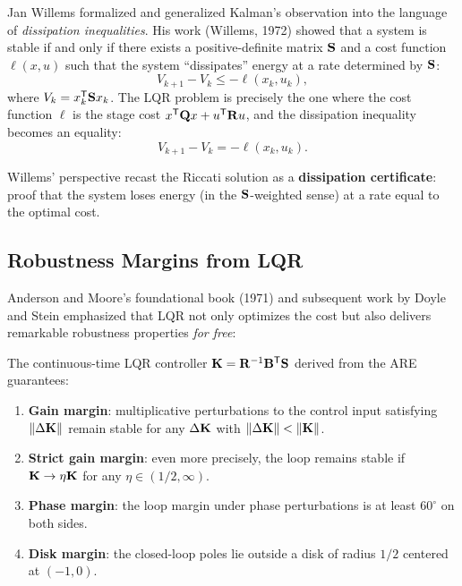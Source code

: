 Jan Willems formalized and generalized Kalman's observation into the language of \textit{dissipation inequalities}.
His work (Willems, 1972) showed that a system is stable if and only if there exists a positive-definite matrix $\mathbf{S}$
and a cost function $\ell(x, u)$ such that the system ``dissipates'' energy at a rate determined by $\mathbf{S}$:
\begin{equation}
V_{k+1} - V_k \leq -\ell(x_k, u_k),
\label{eq:ch6:dissipation}
\end{equation}
where $V_k = x_k^{\mathsf{T}} \mathbf{S} x_k$. The LQR problem is precisely the one where the cost function $\ell$ is the stage cost
$x^{\mathsf{T}}\mathbf{Q} x + u^{\mathsf{T}}\mathbf{R} u$, and the dissipation inequality becomes an equality:
\begin{equation}
V_{k+1} - V_k = -\ell(x_k, u_k).
\label{eq:ch6:lqr-dissipation}
\end{equation}

Willems' perspective recast the Riccati solution as a \textbf{dissipation certificate}: proof that the system loses
energy (in the $\mathbf{S}$-weighted sense) at a rate equal to the optimal cost.

\subsection{Robustness Margins from LQR}

Anderson and Moore's foundational book (1971) and subsequent work by Doyle and Stein emphasized that LQR not only
optimizes the cost but also delivers remarkable robustness properties \textit{for free}:

\begin{proposition}
\label{prop:ch6:lqr-margins}
The continuous-time LQR controller $\mathbf{K} = \mathbf{R}^{-1}\mathbf{B}^{\mathsf{T}}\mathbf{S}$ derived from the ARE guarantees:
\begin{enumerate}
\item \textbf{Gain margin}: multiplicative perturbations to the control input satisfying $\|\Delta\mathbf{K}\|$ remain
      stable for any $\Delta\mathbf{K}$ with $\|\Delta\mathbf{K}\| < \|\mathbf{K}\|$.
\item \textbf{Strict gain margin}: even more precisely, the loop remains stable if $\mathbf{K} \to \eta\mathbf{K}$
      for any $\eta \in (1/2, \infty)$.
\item \textbf{Phase margin}: the loop margin under phase perturbations is at least $60^\circ$ on both sides.
\item \textbf{Disk margin}: the closed-loop poles lie outside a disk of radius $1/2$ centered at $(-1, 0)$.
\end{enumerate}
\end{proposition}

